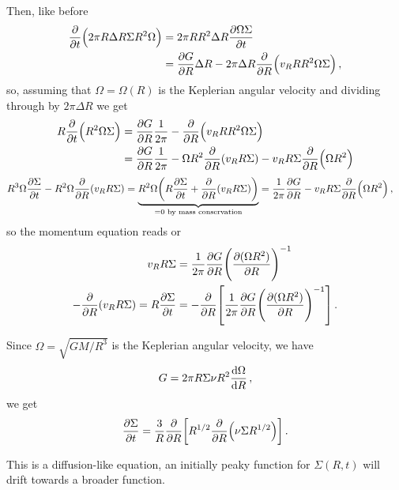 \documentclass[main.tex]{subfiles}
\begin{document}
Then, like before 
%
\begin{align}
\pdv{}{t} \qty(2 \pi R \Delta R \Sigma R^2 \Omega ) &= 2 \pi R R^2 \Delta R \pdv{\Omega \Sigma }{t}   \\
&= \pdv{G}{R} \Delta R  - 2 \pi \Delta R \pdv{}{R} \qty(v_R R R^2 \Omega \Sigma )
\,,
\end{align}
%
so, assuming that \(\Omega = \Omega (R)\) is the Keplerian angular velocity and dividing through by \(2 \pi \Delta R\) we get 
%
\begin{align}
R \pdv{}{t} \qty(R^2\Omega \Sigma ) &= \pdv{G}{R} \frac{1}{2 \pi } - \pdv{}{R} \qty(v_R R R^2 \Omega \Sigma )  \\
&= \pdv{G}{R} \frac{1}{2 \pi } - \Omega R^2 \pdv{}{R} \qty(v_R R \Sigma ) - v_R R \Sigma \pdv{}{R} \qty(\Omega R^2) 
\end{align}
\begin{align}
R^3 \Omega \pdv{\Sigma }{t} - R^2 \Omega \pdv{}{R} \qty(v_R R \Sigma ) 
= \underbrace{R^2 \Omega \qty(R \pdv{\Sigma }{t} + \pdv{}{R} \qty(v_R R \Sigma ))}_{= 0 \text{ by mass conservation}}
&= \frac{1}{2 \pi } \pdv{G}{R} - v_R R \Sigma \pdv{R}( \Omega R^2)
\,,
\end{align}
%
so the momentum equation reads 
%
%
or 
%
\begin{align}
v_R R \Sigma &= \frac{1}{2 \pi } \pdv{G}{R} \qty(\pdv{(\Omega R^2)}{R})^{-1}  \\
-\pdv{R}(v_R R \Sigma ) =
R \pdv{\Sigma }{t} &= - \pdv{}{R} \qty[ \frac{1}{2 \pi } \pdv{G}{R} \qty(\pdv{(\Omega R^2)}{R})^{-1}]
\,.
\end{align}

Since \(\Omega = \sqrt{GM / R^3} \) is the Keplerian angular velocity, we have 
%
\begin{align} \label{eq:local-torque-explicit}
G = 2 \pi R \Sigma \nu R^2 \dv{\Omega }{R}
\,,
\end{align}
%
we get 
%
\begin{align} \label{eq:keplerian-differentiated-momentum-conservation}
\pdv{\Sigma }{t} = \frac{3}{R} \pdv{}{R} \qty[R^{1/2} \pdv{R} (\nu \Sigma R^{1/2})] 
\,.
\end{align}

This is a diffusion-like equation, an initially peaky function for \(\Sigma (R, t)\) will drift towards a broader function. 
\end{document}
